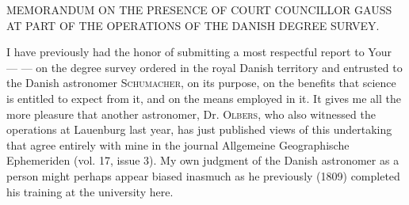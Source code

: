 \par\bigskip
{}
\begin{center}\large MEMORANDUM ON THE PRESENCE OF COURT COUNCILLOR GAUSS AT PART OF THE OPERATIONS OF THE DANISH DEGREE SURVEY.\end{center}
\par
I have previously had the honor of submitting a most respectful report to Your — — on the degree survey ordered in the royal Danish territory and entrusted to the Danish astronomer \textsc{Schumacher}, on its purpose, on the benefits that science is entitled to expect from it, and on the means employed in it. It gives me all the more pleasure that another astronomer, Dr. \textsc{Olbers}, who also witnessed the operations at Lauenburg last year, has just published views of this undertaking that agree entirely with mine in the journal Allgemeine Geographische Ephemeriden (vol. 17, issue 3). My own judgment of the Danish astronomer as a person might perhaps appear biased inasmuch as he previously (1809) completed his training at the university here.
